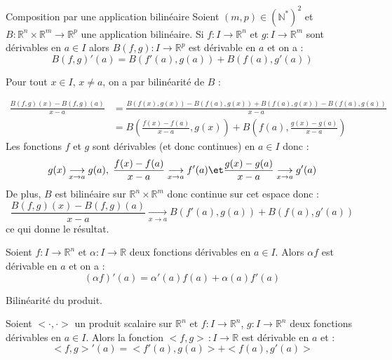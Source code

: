 \documentclass[french,11pt,twoside]{VcCours}
\begin{document}
\begin{Proposition}{Composition par une application bilinéaire}
Soient $(m,p) \in (\mathbb{N}^*)^2$ et $B : \mathbb{R}^n \times \mathbb{R}^m \rightarrow \mathbb{R}^p$ une application bilinéaire. Si $f : I \rightarrow \mathbb{R}^n$ et $g : I \rightarrow \mathbb{R}^m$ sont dérivables en $a \in I$ alors $B(f,g):  I \rightarrow \mathbb{R}^p$ est dérivable en $a$ et on a :
$$ B(f,g)'(a)= B(f'(a),g(a))+B(f(a),g'(a))$$
\end{Proposition}

\begin{Demonstration}{}
Pour tout $x \in I$, $x \neq a$, on a par bilinéarité de $B$ :

\begin{align*}
\frac{B(f,g)(x)-B(f,g)(a)}{x-a} & =\frac{B(f(x),g(x))-B(f(a),g(x))+B(f(a),g(x))-B(f(a),g(a))}{x-a} \\
& = B \left( \frac{f(x)-f(a)}{x-a},g(x) \right) + B \left( f(a), \frac{g(x)-g(a)}{x-a} \right) 
\end{align*}
Les fonctions $f$ et $g$ sont dérivables (et donc continues) en $a \in I$ donc :
$$ g(x) \underset{x \rightarrow a}{\longrightarrow} g(a), \; \frac{f(x)-f(a)}{x-a}\underset{x \rightarrow a}{\longrightarrow} f'(a) \et \frac{g(x)-g(a)}{x-a} \underset{x \rightarrow a}{\longrightarrow} g'(a)$$
De plus, $B$ est bilinéaire sur $\mathbb{R}^n \times \mathbb{R}^m$ donc continue sur cet espace donc :
$$ \frac{B(f,g)(x)-B(f,g)(a)}{x-a}   \underset{x \rightarrow a}{\longrightarrow}  B(f'(a),g(a))+ B(f(a),g'(a))$$
ce qui donne le résultat.
\end{Demonstration}

\begin{Corollaire}{} Soient $f : I \rightarrow \mathbb{R}^n$ et $\alpha : I \rightarrow \mathbb{R}$ deux fonctions dérivables en $a \in I$. Alors $\alpha f $ est dérivable en $a$ et on a :
$$ (\alpha f)'(a) = \alpha'(a) f(a) + \alpha(a) f'(a)$$
\end{Corollaire}

\begin{Demonstration}{} Bilinéarité du produit.
\end{Demonstration}

\begin{Corollaire}{} Soient $< \cdot , \cdot>$ un produit scalaire sur $\mathbb{R}^n$ et $f: I \rightarrow \mathbb{R}^n$, $g : I \rightarrow \mathbb{R}^n$ deux fonctions dérivables en $a \in I$. Alors la fonction $<f,g> \, :  I \rightarrow \mathbb{R}$ est dérivable en $a$ et :
$$ <f,g>'(a) = <f'(a),g(a)>+<f(a),g'(a)>$$
\end{Corollaire}
\end{document}
